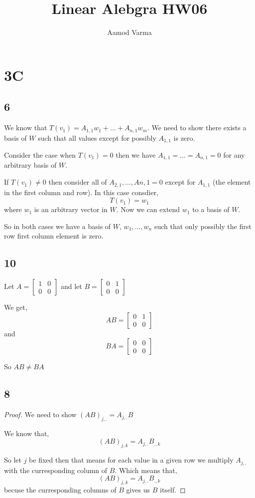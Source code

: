 \documentclass[a4paper]{report}
\title{Linear Alebgra HW06}
\author{Aamod Varma}
\begin{document}
\maketitle
\date{}


\section*{3C}

\subsection*{6}
We know that $T(v_1) = A_{1,1}w_1 + \dots + A_{n,1}w_m$. We need to show there exists a basis of $W$ such that all values except for possibly  $A_{1,1}$ is zero.

Consider the case when $T(v_1) = 0$ then we have $A_{1,1} = \dots = A_{n,1} = 0$ for any arbitrary basis of $W$.

If $T(v_1) \ne 0$ then consider all of $A_{2,1},\dots,A{n,1} = 0$ except for $A_{1,1}$ (the element in the first column and row). In this case consdier, 
$$ T(v_1) = w_1 $$ where $w_1$ is an arbitrary vector in $W$. Now we can extend $w_1$ to a basis of $W$.

So in both cases we have a basis of $W$, $w_1,\dots,w_n$ such that only possibly the first row first column element is zero.


\subsection*{10}
Let $A = \begin{bmatrix}
1 & 0\\
0 & 0 
\end{bmatrix}$
and let 
$B = \begin{bmatrix}
0 & 1\\
0 & 0 
\end{bmatrix}$


We get, 
$$ AB = \begin{bmatrix}
    0&1\\
0&0\end{bmatrix}$$
and 
$$ BA = \begin{bmatrix}
    0&0\\
0&0\end{bmatrix}$$ 


So $AB \ne BA$
\subsection*{8}

\begin{proof}
    We need to show $(AB)_{j,.} = A_{j,.}B$

    We know that,
    $$ (AB)_{j,k} = A_{j,.}B_{.,k} $$ 

    So let $j$ be fixed then that means for each value in a given row we multiply $A_{j,.}$ with the curresponding column of $B$. Which means that, 
    $$ (AB)_{j,k} = A_{j,.}B_{.,k} $$ becuse the curresponding columns of $B$ gives us $B$ itself.
\end{proof}
\end{document}
